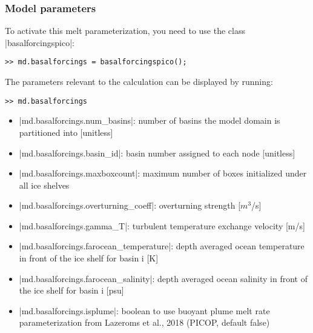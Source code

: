 \subsubsection{Model parameters}
To activate this melt parameterization, you need to use the class \lstinlinebg|basalforcingspico|:
\begin{lstlisting}
>> md.basalforcings = basalforcingspico();
\end{lstlisting}
The parameters relevant to the calculation can be displayed by running:
\begin{lstlisting}
>> md.basalforcings
\end{lstlisting}

\begin{itemize}
	\item \lstinlinebg|md.basalforcings.num_basins|: number of basins the model domain is partitioned into [unitless]
	\item \lstinlinebg|md.basalforcings.basin_id|: basin number assigned to each node [unitless]
	\item \lstinlinebg|md.basalforcings.maxboxcount|: maximum number of boxes initialized under all ice shelves
	\item \lstinlinebg|md.basalforcings.overturning_coeff|: overturning strength [$m^3$/s]
	\item \lstinlinebg|md.basalforcings.gamma_T|: turbulent temperature exchange velocity [m/s]
	\item \lstinlinebg|md.basalforcings.farocean_temperature|: depth averaged ocean temperature in front of the ice shelf for basin i [K]
	\item \lstinlinebg|md.basalforcings.farocean_salinity|: depth averaged ocean salinity in front of the ice shelf for basin i [psu]
	\item \lstinlinebg|md.basalforcings.isplume|: boolean to use buoyant plume melt rate parameterization from Lazeroms et al., 2018 (PICOP, default false)
\end{itemize}

